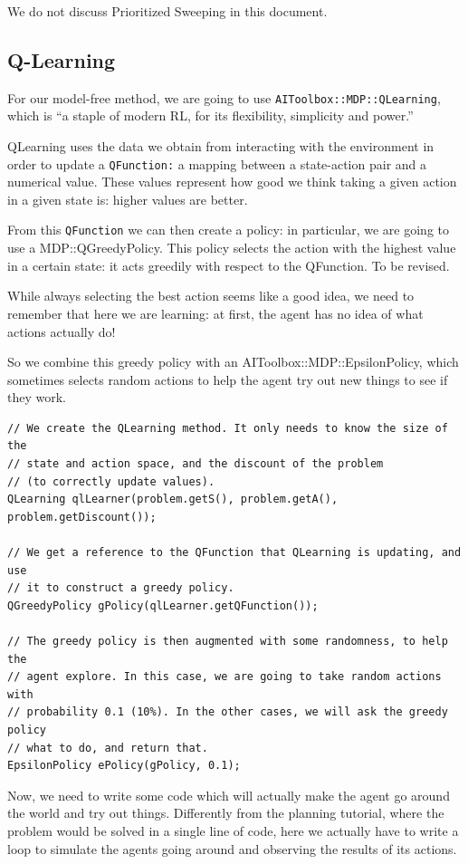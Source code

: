 \documentclass{article}
\begin{document}
We do not discuss Prioritized Sweeping in this document.

\subsection{Q-Learning}
For our model-free method, we are going to use \verb!AIToolbox::MDP::QLearning!, which is ``a staple of modern RL,
 for its flexibility, simplicity and power.''

QLearning uses the data we obtain from interacting with the environment in order to update a \verb!QFunction:! 
a mapping between a state-action pair and a numerical value.
These values represent how good we think taking a given action in a given state is: higher values are better.

From this \verb!QFunction! we can then create a policy: in particular, we are going to use a MDP::QGreedyPolicy. 
This policy selects the action with the highest value in a certain state: it acts greedily with respect to the QFunction.
To be revised.

While always selecting the best action seems like a good idea, we need to remember that here we are learning: at first,
the agent has no idea of what actions actually do!

So we combine this greedy policy with an AIToolbox::MDP::EpsilonPolicy, which sometimes selects random actions to help the agent
try out new things to see if they work.
\begin{small}
	\begin{verbatim}
// We create the QLearning method. It only needs to know the size of the
// state and action space, and the discount of the problem 
// (to correctly update values).
QLearning qlLearner(problem.getS(), problem.getA(), problem.getDiscount());

// We get a reference to the QFunction that QLearning is updating, and use
// it to construct a greedy policy.
QGreedyPolicy gPolicy(qlLearner.getQFunction());

// The greedy policy is then augmented with some randomness, to help the
// agent explore. In this case, we are going to take random actions with
// probability 0.1 (10%). In the other cases, we will ask the greedy policy
// what to do, and return that.
EpsilonPolicy ePolicy(gPolicy, 0.1);
\end{verbatim}
\end{small}
Now, we need to write some code which will actually make the agent go around the world and try out things. 
Differently from the planning tutorial, where the problem would be solved in a single line of code, here we actually
 have to write a loop to simulate the agents going around and observing the results of its actions.
\end{document}
